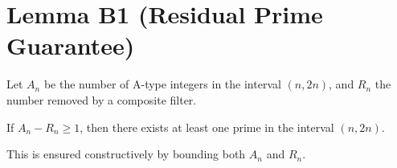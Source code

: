 
\section*{Lemma B1 (Residual Prime Guarantee)}

Let \( A_n \) be the number of A-type integers in the interval \( (n, 2n) \), and \( R_n \) the number removed by a composite filter.

If \( A_n - R_n \geq 1 \), then there exists at least one prime in the interval \( (n, 2n) \).

This is ensured constructively by bounding both \( A_n \) and \( R_n \).
